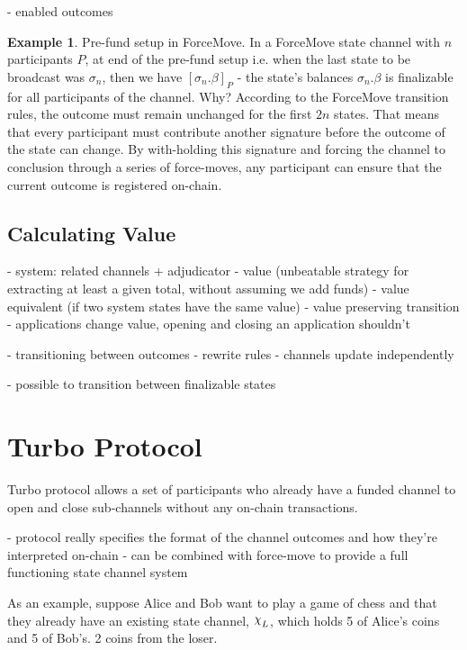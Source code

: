 \documentclass{article}
\DeclareRobustCommand{\rchi}{{\mathpalette\irchi\relax}}
\newcommand{\irchi}[2]{\raisebox{\depth}{$#1\chi$}} %
\theoremstyle{definition}
\newtheorem{example}{Example}[section]
\newcommand{\enf}[1]{[#1]}
\begin{document}
- enabled outcomes

\begin{example}{Pre-fund setup in ForceMove.}
  In a ForceMove state channel with $n$ participants $P$, at end of the pre-fund setup i.e.
  when the last state to be broadcast was $\sigma_n$, then we have $\enf{\sigma_n.\beta}_P$ -
  the state's balances $\sigma_n.\beta$ is finalizable for all participants of the channel.
  Why? According to the ForceMove transition rules, the outcome must remain unchanged for the
  first $2n$ states. That means that every participant must contribute another signature before
  the outcome of the state can change. By with-holding this signature and forcing the channel to
  conclusion through a series of force-moves, any participant can ensure that the current
  outcome is registered on-chain.
\end{example}

\subsection{Calculating Value}

- system: related channels + adjudicator
- value (unbeatable strategy for extracting at least a given total, without assuming we add funds)
- value equivalent (if two system states have the same value)
- value preserving transition
- applications change value, opening and closing an application shouldn't

- transitioning between outcomes
- rewrite rules
- channels update independently

- possible to transition between finalizable states

\section{Turbo Protocol}

Turbo protocol allows a set of participants who already have a funded channel to open and
close sub-channels without any on-chain transactions. 

- protocol really specifies the format of the channel outcomes and how they're interpreted on-chain
- can be combined with force-move to provide a full functioning state channel system

As an example, suppose Alice and Bob want to play a game of chess and that
they already have an existing state channel, $\rchi_L$, which holds
5 of Alice's coins and 5 of Bob's.
2 coins from the loser.
\end{document}
